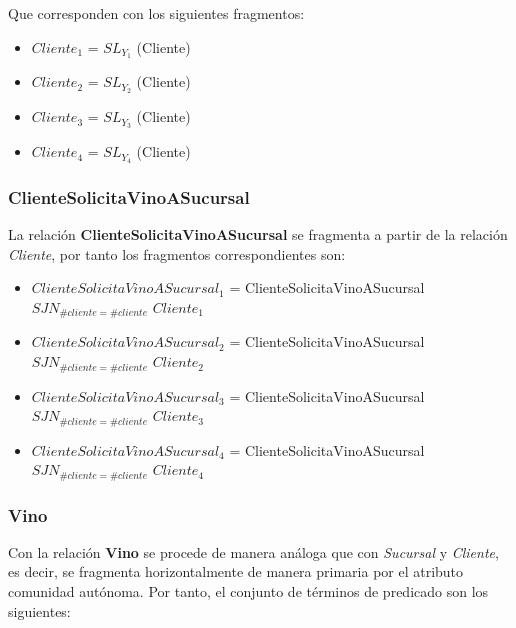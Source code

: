 \documentclass[paper=a4, fontsize=12pt]{article} %
\numberwithin{equation}{section} %
\numberwithin{figure}{section} %
\numberwithin{table}{section} %
\begin{document}
Que corresponden con los siguientes fragmentos: 

\begin{itemize}
\item $Cliente_{1}$ = $SL_{Y_{1}}$ (Cliente)
\item $Cliente_{2}$ = $SL_{Y_{2}}$ (Cliente)
\item $Cliente_{3}$ = $SL_{Y_{3}}$ (Cliente)
\item $Cliente_{4}$ = $SL_{Y_{4}}$ (Cliente)
\end{itemize}

\subsubsection{ClienteSolicitaVinoASucursal}

La relación \textbf{ClienteSolicitaVinoASucursal} se fragmenta a partir de la relación \textit{Cliente}, por tanto los fragmentos correspondientes son: \\
\begin{itemize}
\item $ClienteSolicitaVinoASucursal_{1}$ = ClienteSolicitaVinoASucursal $SJN_{\#cliente = \#cliente}$ $Cliente_{1}$
\item $ClienteSolicitaVinoASucursal_{2}$ = ClienteSolicitaVinoASucursal $SJN_{\#cliente = \#cliente}$ $Cliente_{2}$
\item $ClienteSolicitaVinoASucursal_{3}$ = ClienteSolicitaVinoASucursal $SJN_{\#cliente = \#cliente}$ $Cliente_{3}$
\item $ClienteSolicitaVinoASucursal_{4}$ = ClienteSolicitaVinoASucursal $SJN_{\#cliente = \#cliente}$ $Cliente_{4}$
\end{itemize}

\subsubsection{Vino}
Con la relación \textbf{Vino} se procede de manera análoga que con \textit{Sucursal} y \textit{Cliente}, es decir, se fragmenta horizontalmente de manera primaria por el atributo comunidad autónoma. Por tanto, el conjunto de términos de predicado son los siguientes:\\
\end{document}
